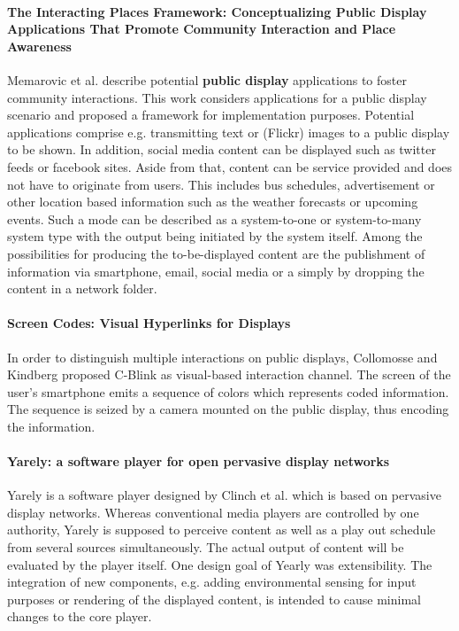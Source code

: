 \paragraph{The Interacting Places Framework: Conceptualizing Public Display Applications That Promote Community Interaction and Place Awareness}
Memarovic et al. \cite{memarovic_places} describe potential \textbf{public display} applications to foster community interactions.
This work considers applications for a public display scenario and proposed a framework for implementation purposes.
Potential applications comprise e.g. transmitting text or (Flickr) images to a public display to be shown.
In addition, social media content can be displayed such as twitter feeds or facebook sites.
Aside from that, content can be service provided and does not have to originate from users.
This includes bus schedules, advertisement or other location based information such as the weather forecasts or upcoming events.
Such a mode can be described as a system-to-one or system-to-many system type with the output being initiated by the system itself.
Among the possibilities for producing the to-be-displayed content are the publishment of information via smartphone, email, social media or a simply by dropping the content in a network folder.

\paragraph{Screen Codes: Visual Hyperlinks for Displays}
In order to distinguish multiple interactions on public displays, Collomosse and Kindberg \cite{Collomosse_ScreenCodes} proposed C-Blink as visual-based interaction channel. The screen of the user’s smartphone emits a sequence of colors which represents coded information. The sequence is seized by a camera mounted on the public display, thus encoding the information.

\paragraph{Yarely: a software player for open pervasive display networks}
Yarely is a software player designed by Clinch et al. \cite{Clinch_Yarely} which is based on pervasive display networks. Whereas conventional media players are controlled by one authority, Yarely is supposed to perceive content as well as a play out schedule from several sources simultaneously. The actual output of content will be evaluated by the player itself.
One design goal of Yearly was extensibility. The integration of new components, e.g. adding environmental sensing for input purposes or rendering of the displayed content, is intended to cause minimal changes to the core player.



